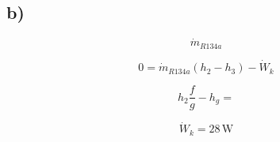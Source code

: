 

\subsection*{b)}

\[
\dot{m}_{R134a}
\]

\[
0 = \dot{m}_{R134a} (h_2 - h_3) - \dot{W}_k
\]

\[
h_2 \frac{f}{g} - h_g =
\]

\[
\dot{W}_k = 28 \, \text{W}
\]
